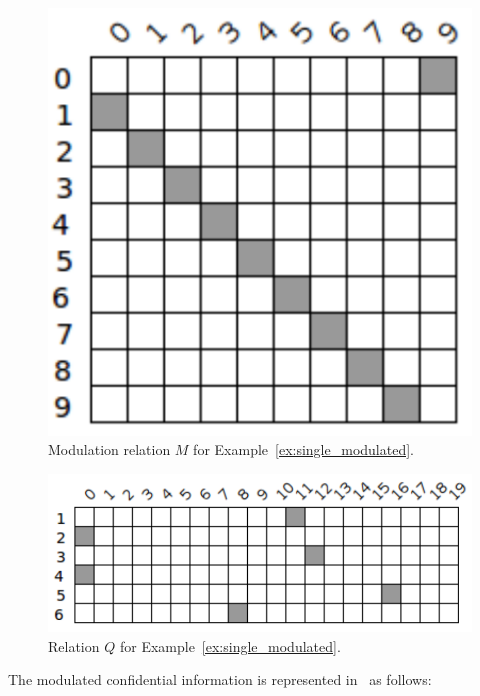 \begin{example}
	\begin{figure}[ht]
		\centering
		\includegraphics[scale=0.65]{Figures/PDF/Relview/NoiseP.pdf}
		\caption{Modulation relation $M$ for Example~\ref{ex:single_modulated}.}
		\label{fig:single_modulated_s}
	\end{figure}
	
	\begin{figure}[ht]
		\centering
		\includegraphics[scale=0.65]{Figures/PDF/Relview/Qmod.pdf}
		\caption{Relation $Q$ for Example~\ref{ex:single_modulated}.}
		\label{fig:single_modulated_q}
	\end{figure}
	\newpage

	The modulated confidential information is represented in \relview\ as follows: \newline
	

\end{example}
